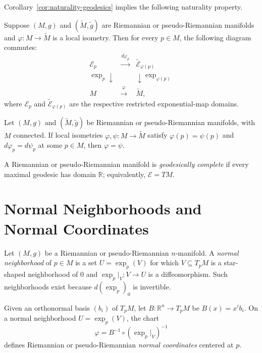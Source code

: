 Corollary~\ref{cor:naturality-geodesics} implies the following naturality
property.

\begin{proposition}
\label{prop:naturality-exponential-map}

Suppose $(M,g)$ and $(\tilde{M},\tilde{g})$ are Riemannian or
pseudo-Riemannian manifolds and $\varphi: M \to \tilde{M}$ is a local
isometry. Then for every $p \in M$, the following diagram commutes:
\[
\begin{array}{ccc}
\mathcal{E}_p & \xrightarrow{\ d\varphi_p\ } & \tilde{\mathcal{E}}_{\varphi(p)} \\
{\scriptstyle \exp_p}\downarrow & & \downarrow{\scriptstyle \exp_{\varphi(p)}} \\
M & \xrightarrow{\ \varphi\ } & \tilde{M},
\end{array}
\]
where $\mathcal E_p$ and $\widetilde{\mathcal E}_{\varphi(p)}$ are the
respective restricted exponential-map domains.
\end{proposition}

\begin{proposition}
\label{prop:local-isometries-completely-determined}
Let $(M, g)$ and $(\tilde{M}, \tilde{g})$ be Riemannian or
pseudo-Riemannian manifolds, with $M$ connected. If local isometries
$\varphi, \psi: M \to \tilde{M}$ satisfy
$\varphi(p) = \psi(p)$ and $d\varphi_p = d\psi_p$ at some $p\in M$, then
$\varphi = \psi$.
\end{proposition}

A Riemannian or pseudo-Riemannian manifold is \emph{geodesically complete} if
every maximal geodesic has domain $\mathbb R$; equivalently,
$\mathcal E=TM$.

\section{Normal Neighborhoods and Normal Coordinates}

Let $(M,g)$ be a Riemannian or pseudo-Riemannian $n$-manifold.  A
\emph{normal neighborhood} of $p\in M$ is a set $U=\exp_p(V)$ for which
$V\subseteq T_pM$ is a star-shaped neighborhood of $0$ and
$\exp_p|_V:V\to U$ is a diffeomorphism.  Such neighborhoods exist because
$d(\exp_p)_0$ is invertible.

Given an orthonormal basis $(b_i)$ of $T_pM$, let
$B:\mathbb R^n\to T_pM$ be $B(x)=x^ib_i$.  On a normal neighborhood
$U=\exp_p(V)$, the chart
\[
\varphi=B^{-1}\circ(\exp_p|_V)^{-1}
\]
defines Riemannian or pseudo-Riemannian \emph{normal coordinates} centered at
$p$.

